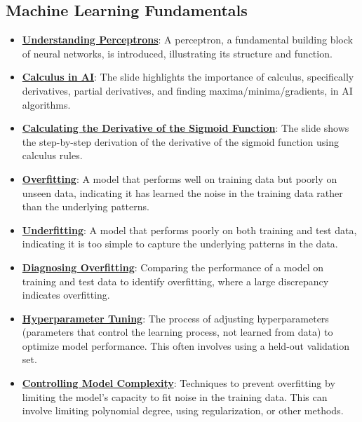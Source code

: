 \documentclass{article}%
\begin{document}
\subsection{Machine Learning Fundamentals}%
\label{subsec:MachineLearningFundamentals}%
\begin{itemize}[leftmargin=*]%
\item \href{https://www.math.purdue.edu/~yipn/351/04L1-Linear Algebra Primer.pdf#page=17}{\textbf{Understanding Perceptrons}}: A perceptron, a fundamental building block of neural networks, is introduced, illustrating its structure and function.%
\item \href{https://www.math.purdue.edu/~yipn/351/04L1-Linear Algebra Primer.pdf#page=19}{\textbf{Calculus in AI}}: The slide highlights the importance of calculus, specifically derivatives, partial derivatives, and finding maxima/minima/gradients, in AI algorithms.%
\item \href{https://www.math.purdue.edu/~yipn/351/04L1-Linear Algebra Primer.pdf#page=21}{\textbf{Calculating the Derivative of the Sigmoid Function}}: The slide shows the step-by-step derivation of the derivative of the sigmoid function using calculus rules.%
\item \href{https://www.math.purdue.edu/~yipn/351/10L1-CrossValidation.pdf#page=2}{\textbf{Overfitting}}: A model that performs well on training data but poorly on unseen data, indicating it has learned the noise in the training data rather than the underlying patterns.%
\item \href{https://www.math.purdue.edu/~yipn/351/10L1-CrossValidation.pdf#page=21}{\textbf{Underfitting}}: A model that performs poorly on both training and test data, indicating it is too simple to capture the underlying patterns in the data.%
\item \href{https://www.math.purdue.edu/~yipn/351/10L1-CrossValidation.pdf#page=12}{\textbf{Diagnosing Overfitting}}: Comparing the performance of a model on training and test data to identify overfitting, where a large discrepancy indicates overfitting.%
\item \href{https://www.math.purdue.edu/~yipn/351/10L1-CrossValidation.pdf#page=14}{\textbf{Hyperparameter Tuning}}: The process of adjusting hyperparameters (parameters that control the learning process, not learned from data) to optimize model performance. This often involves using a held-out validation set.%
\item \href{https://www.math.purdue.edu/~yipn/351/10L1-CrossValidation.pdf#page=16}{\textbf{Controlling Model Complexity}}: Techniques to prevent overfitting by limiting the model's capacity to fit noise in the training data. This can involve limiting polynomial degree, using regularization, or other methods.%

\end{itemize}
\end{document}

